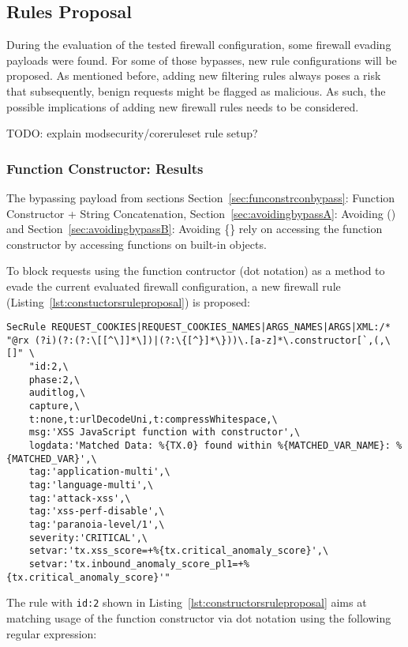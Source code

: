 \subsection{Rules Proposal}
\label{sec:rulesproposal}
During the evaluation of the tested firewall configuration, some firewall evading payloads were found. For some of those bypasses, new rule configurations will be proposed. As mentioned before, adding new filtering rules always poses a risk that subsequently, benign requests might be flagged as malicious. As such, the possible implications of adding new firewall rules needs to be considered.

	{\color{red} TODO: explain modsecurity/coreruleset rule setup?}

\subsubsection{Function Constructor: Results}
\label{sec:rulespropfunctionconstructor}
The bypassing payload from sections Section~\ref{sec:funconstrconbypass}: Function Constructor + String Concatenation, Section~\ref{sec:avoidingbypassA}: Avoiding () and Section~\ref{sec:avoidingbypassB}: Avoiding \{\} rely on accessing the function constructor by accessing functions on built-in objects.

To block requests using the function contructor (dot notation) as a method to evade the current evaluated firewall configuration, a new firewall rule (Listing~\ref{lst:constuctorsruleproposal}) is proposed:

\begin{lstlisting}[style=basicStyle, caption=rule proposal to block usage of function constructor via dot notation, label={lst:constructorsruleproposal}]
SecRule REQUEST_COOKIES|REQUEST_COOKIES_NAMES|ARGS_NAMES|ARGS|XML:/* "@rx (?i)(?:(?:\[[^\]]*\])|(?:\{[^}]*\}))\.[a-z]*\.constructor[`,(,\[]" \
    "id:2,\
    phase:2,\
    auditlog,\
    capture,\
    t:none,t:urlDecodeUni,t:compressWhitespace,\
    msg:'XSS JavaScript function with constructor',\
    logdata:'Matched Data: %{TX.0} found within %{MATCHED_VAR_NAME}: %{MATCHED_VAR}',\
    tag:'application-multi',\
    tag:'language-multi',\
    tag:'attack-xss',\
    tag:'xss-perf-disable',\
    tag:'paranoia-level/1',\
    severity:'CRITICAL',\
    setvar:'tx.xss_score=+%{tx.critical_anomaly_score}',\
    setvar:'tx.inbound_anomaly_score_pl1=+%{tx.critical_anomaly_score}'"
\end{lstlisting}

The rule with \verb|id:2| shown in Listing~\ref{lst:constructorsruleproposal} aims at matching usage of the function constructor via dot notation using the following regular expression:

